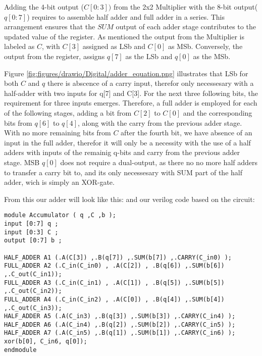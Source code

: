 Adding the 4-bit output ($C[0:3])$ from the 2x2 Multiplier with the 8-bit output($q[0:7]$) requires to assemble half adder and full adder in a series. This arrangement ensures that the $SUM$ output of each adder stage contributes to the updated value of the register. As mentioned the output from the Multiplier is labeled as $C$, with $C[3]$ assigned as LSb and $C[0]$ as MSb. Conversely, the output from the register, assigns $q[7]$ as the LSb and $q[0]$ as the MSb.


Figure \ref{fig:figures/drawio/Digital/adder_equation.png} illustrates that LSb for both $C$ and $q$ there is abscence of a carry input, therefor only necessesary with a half-adder with two inputs for q[7] and C[3]. For the next three following bits, the requirement for three inputs emerges. Therefore, a full adder is employed for each of the following stages, adding a bit from $C[2]$ to $C[0]$ and the corresponding bits from $q[6]$ to $q[4]$, along with the carry from the previous adder stage. With no more remaining bits from $C$ after the fourth bit, we have absence of an input in the full adder, therefor it will only be a necessity with the use of a half adders with inputs of the remainig q-bits and carry from the previous adder stage. MSB $q[0]$ does not require a dual-output, as there no no more half adders to transfer a carry bit to, and its only necessesary with SUM part of the half adder, wich is simply an XOR-gate.

From this our adder will look like this:
and our verilog code based on the circuit:
\begin{lstlisting}
module Accumulator ( q ,C ,b );
input [0:7] q ;
input [0:3] C ;
output [0:7] b ;

HALF_ADDER A1 (.A(C[3]) ,.B(q[7]) ,.SUM(b[7]) ,.CARRY(C_in0) );
FULL_ADDER A2 (.C_in(C_in0) , .A(C[2]) , .B(q[6]) ,.SUM(b[6]) ,.C_out(C_in1));	
FULL_ADDER A3 (.C_in(C_in1) , .A(C[1]) , .B(q[5]) ,.SUM(b[5]) ,.C_out(C_in2));	 
FULL_ADDER A4 (.C_in(C_in2) , .A(C[0]) , .B(q[4]) ,.SUM(b[4]) ,.C_out(C_in3));
HALF_ADDER A5 (.A(C_in3) ,.B(q[3]) ,.SUM(b[3]) ,.CARRY(C_in4) );  
HALF_ADDER A6 (.A(C_in4) ,.B(q[2]) ,.SUM(b[2]) ,.CARRY(C_in5) );
HALF_ADDER A7 (.A(C_in5) ,.B(q[1]) ,.SUM(b[1]) ,.CARRY(C_in6) );
xor(b[0], C_in6, q[0]);
endmodule
\end{lstlisting}

